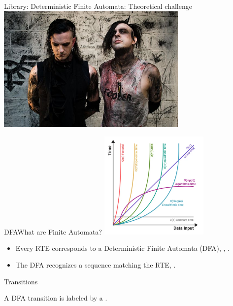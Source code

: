 


{  
\begin{frame}{Library: }{Deterministic Finite Automata: Theoretical challenge }
  \centering
  \includegraphics[width=0.7\textwidth]{fa-band.jpg}
\end{frame}
}

\begin{frame}{DFA}{What are Finite Automata?}
  \includegraphics[width=0.4\textwidth]{complexity.png}

  \begin{itemize}
  \item   Every RTE corresponds to a Deterministic Finite Automata (DFA), , .

  \item   The DFA recognizes a sequence matching the RTE, .

  \end{itemize}
\end{frame}

\begin{frame}{ Transitions}

  \scalebox{0.8}{}

  A DFA transition is labeled by a .
\end{frame}



